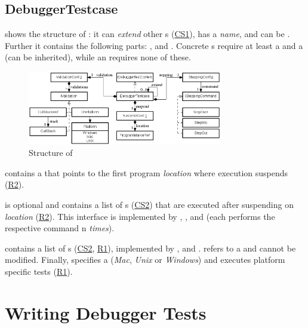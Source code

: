 \subsection{DebuggerTestcase}

 shows the structure of
:
it can \emph{extend} other s (\hyperref[CS1]{CS1}),
has a \emph{name}, and can be . Further it contains the following
parts: ,  and
. Concrete s require at least  
a  and a  (can be inherited),
while an   requires none of these.
 
\begin{figure}[h]
	\vspace{-2mm}
	\centering
    \includegraphics[width=8.5cm]{./figures/graph4-1.png} 
    \vspace{-2mm}
	\caption{Structure of }
	\label{fig:DebuggerTestcaseStructure}
	\vspace{-2mm}
\end{figure}

 contains a  that points to the first
program \emph{location} where execution suspends (\hyperref[R2]{R2}). 

 is optional and contains a
list of s (\hyperref[CS2]{CS2}) that are executed after
suspending on \emph{location} (\hyperref[R2]{R2}). This interface is implemented by 
, , and  (each performs the
respective command n \emph{times}).

 contains a list of s
(\hyperref[CS2]{CS2}, \hyperref[R1]{R1}), implemented by
,  and .
 refers to a  and cannot
be modified. Finally,  specifies a 
(\emph{Mac}, \emph{Unix} or \emph{Windows}) and executes 
platform specific tests (\hyperref[R1]{R1}).

\section{Writing Debugger Tests}

